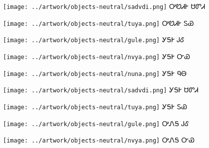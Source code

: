 \documentclass[avery5371,frame]{flashcards}%
\begin{document}
\begin{flashcard}{
\texttt{[image: ../artwork/objects-neutral/sadvdi.png]}
}\Huge ᎤᏬᏗᎨ ᏌᏛᏗ
\end{flashcard}

\begin{flashcard}{
\texttt{[image: ../artwork/objects-neutral/tuya.png]}
}\Huge ᎤᏬᏗᎨ ᏚᏯ
\end{flashcard}

\begin{flashcard}{
\texttt{[image: ../artwork/objects-neutral/gule.png]}
}\Huge ᎩᎦᎨ ᎫᎴ
\end{flashcard}

\begin{flashcard}{
\texttt{[image: ../artwork/objects-neutral/nvya.png]}
}\Huge ᎩᎦᎨ ᏅᏯ
\end{flashcard}

\begin{flashcard}{
\texttt{[image: ../artwork/objects-neutral/nuna.png]}
}\Huge ᎩᎦᎨ ᏄᎾ
\end{flashcard}

\begin{flashcard}{
\texttt{[image: ../artwork/objects-neutral/sadvdi.png]}
}\Huge ᎩᎦᎨ ᏌᏛᏗ
\end{flashcard}

\begin{flashcard}{
\texttt{[image: ../artwork/objects-neutral/tuya.png]}
}\Huge ᎩᎦᎨ ᏚᏯ
\end{flashcard}

\begin{flashcard}{
\texttt{[image: ../artwork/objects-neutral/gule.png]}
}\Huge ᎤᏁᎦ ᎫᎴ
\end{flashcard}

\begin{flashcard}{
\texttt{[image: ../artwork/objects-neutral/nvya.png]}
}\Huge ᎤᏁᎦ ᏅᏯ
\end{flashcard}
\end{document}
